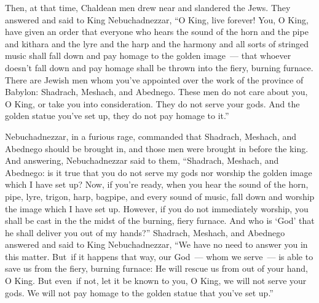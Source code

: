 \begin{inparaenum}
   Then, at that time, Chaldean men drew near and slandered the Jews.%
   They answered and said to King Nebuchadnezzar, ``O King, live forever!%
   You, O King, have given an order that everyone who hears the sound of the horn and the pipe and kithara and the lyre and the harp and the harmony and all sorts of stringed music shall fall down and pay homage to the golden image~---%
   that whoever doesn't fall down and pay homage shall be thrown into the fiery, burning furnace.%
   There are Jewish men whom you've appointed over the work of the province of Babylon: Shadrach, Meshach, and Abednego. These men do not care about you, O King, or take you into consideration. They do not serve your gods. And the golden statue you've set up, they do not pay homage to it.''\understood{}%

   Nebuchadnezzar, in a furious rage, commanded that Shadrach, Meshach, and Abednego should be brought in, and those men were brought in before the king.%
   And answering, Nebuchadnezzar said to them, ``Shadrach, Meshach, and Abednego: is it true that you do not serve my gods nor worship the golden image which I have set up?%
   Now, if you're ready, when you hear the sound of the horn, pipe, lyre, trigon, harp, bagpipe, and every sound of music, fall down and worship the image which I have set up. However, if you do not immediately worship, you shall be cast in the the midst of the burning, fiery furnace. And who is `God' that he shall deliver you out of my hands?''%
   Shadrach, Meshach, and Abednego answered and said to King Nebuchadnezzar, ``We have no need to answer you in this matter.%
   But\understood{}\ if it happens that way, our God~--- whom we serve~--- is able to save us from the fiery, burning furnace: He will rescue us from out of your hand, O King.%
   But even\understood{}\ if not, let it be known to you, O King, we will not serve your gods. We will not pay homage to the golden statue that you've set up.''%


\end{inparaenum}
